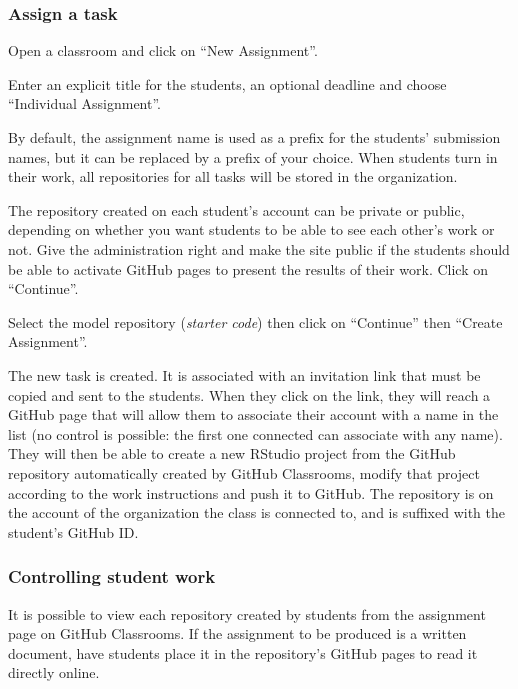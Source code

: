 \documentclass[
  12pt,
  american,
  a4paper,
  extrafontsizes,onecolumn,openright
  ]{memoir}
\begin{document}
\hypertarget{assign-a-task}{%
\subsubsection{Assign a task}\label{assign-a-task}}

Open a classroom and click on \enquote{New Assignment}.

Enter an explicit title for the students, an optional deadline and choose \enquote{Individual Assignment}.

By default, the assignment name is used as a prefix for the students' submission names, but it can be replaced by a prefix of your choice.
When students turn in their work, all repositories for all tasks will be stored in the organization.

The repository created on each student's account can be private or public, depending on whether you want students to be able to see each other's work or not.
Give the administration right and make the site public if the students should be able to activate GitHub pages to present the results of their work.
Click on \enquote{Continue}.

Select the model repository (\emph{starter code}) then click on \enquote{Continue} then \enquote{Create Assignment}.

The new task is created.
It is associated with an invitation link that must be copied and sent to the students.
When they click on the link, they will reach a GitHub page that will allow them to associate their account with a name in the list (no control is possible: the first one connected can associate with any name).
They will then be able to create a new RStudio project from the GitHub repository automatically created by GitHub Classrooms, modify that project according to the work instructions and push it to GitHub.
The repository is on the account of the organization the class is connected to, and is suffixed with the student's GitHub ID.

\hypertarget{controlling-student-work}{%
\subsubsection{Controlling student work}\label{controlling-student-work}}

It is possible to view each repository created by students from the assignment page on GitHub Classrooms.
If the assignment to be produced is a written document, have students place it in the repository's GitHub pages to read it directly online.
\end{document}
